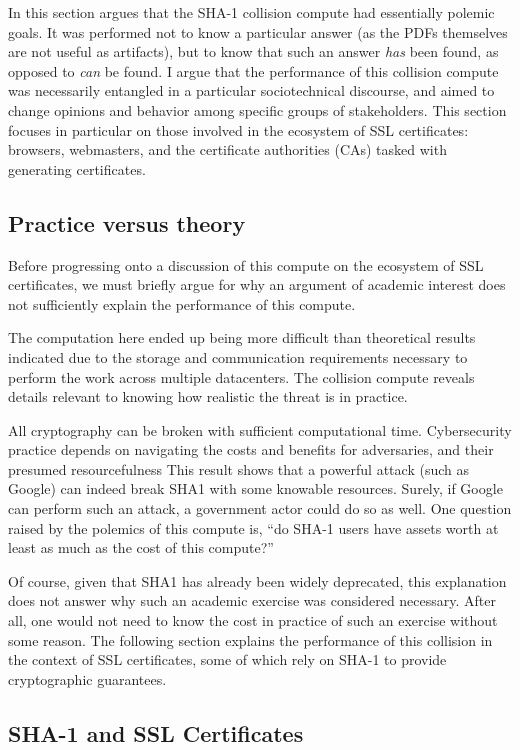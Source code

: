\documentclass[sigconf]{acmart}
\begin{document}
In this section argues that
the SHA-1 collision compute had essentially polemic goals.
It was performed not to know a particular answer
(as the PDFs themselves are not useful as artifacts), 
but to know that such an answer \emph{has} been found,
as opposed to \emph{can} be found.
I argue that the performance of this collision compute
was necessarily entangled in a particular sociotechnical discourse,
and aimed to change opinions and behavior among specific groups of stakeholders.
This section focuses in particular on those involved in the ecosystem of SSL certificates: browsers, webmasters, and the certificate authorities (CAs) tasked with generating certificates.

\subsection{Practice versus theory}
\label{sec:org97c18c5}

Before progressing onto a discussion of this compute on the ecosystem of SSL certificates,
we must briefly argue for why an argument of academic interest does not sufficiently explain the performance of this compute.

The computation here ended up being more difficult than theoretical results indicated due to the storage and communication requirements necessary to perform the work across multiple datacenters. 
The collision compute reveals details relevant
to knowing how realistic the threat is in practice. 

All cryptography can be broken with sufficient computational time.
Cybersecurity practice depends on navigating the costs and benefits for adversaries, and their presumed resourcefulness
This result shows that a powerful attack (such as Google) can indeed break SHA1 with some knowable resources.
Surely, if Google can perform such an attack, a government actor could do so as well.
One question raised by the polemics of this compute is, ``do SHA-1 users have assets worth at least as much as the cost of this compute?''

Of course, given that SHA1 has already been widely deprecated, this explanation does not answer why such an academic exercise was considered necessary.
After all, one would not need to know the cost in practice of such an exercise without some reason.
The following section explains the performance of this collision in the context of SSL certificates, some of which rely on SHA-1 to provide cryptographic guarantees.

\subsection{SHA-1 and SSL Certificates}
\label{sec:orge524adb}
\end{document}
